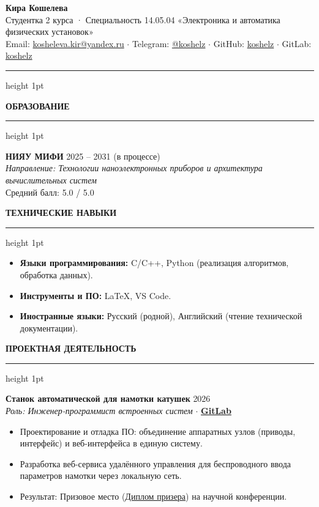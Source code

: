 \documentclass[10pt,a4paper]{article}
\newcommand{\linedsection}[1]{%
  \vspace{10pt}%
  \noindent
  {\bfseries\Large\color{primary} #1}%
  \par\vspace{3pt}%
  {{\color{primary}\hrule height 1pt}}
  \par\vspace{6pt}%
  \noindent
}
\begin{document}
\begin{center}
    {\Huge \bfseries \color{primary} Кира Кошелева} \\[6pt]
    {\large Студентка 2 курса · Специальность 14.05.04 «Электроника и автоматика физических установок»} \\[4pt]
    \small 
    Email: \href{mailto:kosheleva.kir@yandex.ru}{kosheleva.kir@yandex.ru} \quad$\cdot$\quad 
    Telegram: \href{https://t.me/koshelz}{@koshelz} \quad$\cdot$\quad 
    GitHub: \href{https://github.com/koshelz}{koshelz} \quad$\cdot$\quad 
    GitLab: \href{https://gitlab.com/koshelz}{koshelz} 
\end{center}

\vspace{-6pt}
{\color{primary}\hrule height 1pt}
\vspace{6pt}

\linedsection{ОБРАЗОВАНИЕ}
\vspace{2pt}
\textbf{\large НИЯУ МИФИ} \hfill \textcolor{subtext}{2025 -- 2031 (в процессе)} \\
\textit{Направление: Технологии наноэлектронных приборов и архитектура вычислительных систем} \\
\small {Средний балл:} 5.0 / 5.0

\linedsection{ТЕХНИЧЕСКИЕ НАВЫКИ}
\begin{itemize}
    \item \textbf{Языки программирования:} C/C++, Python (реализация алгоритмов, обработка данных).
    \item \textbf{Инструменты и ПО:} LaTeX, VS Code.
    \item \textbf{Иностранные языки:} Русский (родной), Английский (чтение технической документации).
\end{itemize}

\linedsection{ПРОЕКТНАЯ ДЕЯТЕЛЬНОСТЬ}
\vspace{2pt}
\textbf{\large Станок автоматической для намотки катушек} \hfill \textcolor{subtext}{2026} \\
\textit{Роль: Инженер-программист встроенных систем} \quad $\cdot$ \quad \href{https://gitlab.com/sstund/winding-machine}{\textbf{GitLab}}
\begin{itemize}
    \item Проектирование и отладка ПО: объединение аппаратных узлов (приводы, интерфейс) и веб-интерфейса в единую систему.
    \item Разработка веб-сервиса удалённого управления для беспроводного ввода параметров намотки через локальную сеть.
    \item Результат: Призовое место (\href{https://gitlab.com/sstund/winding-machine/-/blob/main/2026-05-15_001.jpg}{\color{accent}Диплом призера}) на научной конференции.
\end{itemize}
\end{document}
